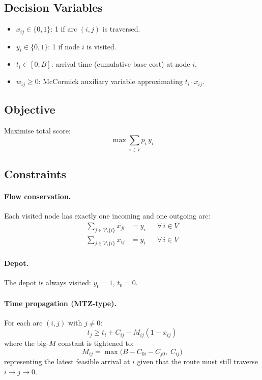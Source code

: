 \documentclass[11pt,a4paper]{article}
\begin{document}
\subsection{Decision Variables}

\begin{itemize}[nosep]
  \item $x_{ij} \in \{0,1\}$: 1 if arc $(i,j)$ is traversed.
  \item $y_i \in \{0,1\}$: 1 if node $i$ is visited.
  \item $t_i \in [0, B]$: arrival time (cumulative base cost) at node $i$.
  \item $w_{ij} \geq 0$: McCormick auxiliary variable approximating $t_i \cdot x_{ij}$.
\end{itemize}

\subsection{Objective}

Maximise total score:
\begin{equation}
  \max \sum_{i \in V} p_i \, y_i
  \label{eq:obj}
\end{equation}

\subsection{Constraints}

\paragraph{Flow conservation.}
Each visited node has exactly one incoming and one outgoing arc:
\begin{align}
  \sum_{j \in V \setminus \{i\}} x_{ji} &= y_i && \forall\, i \in V \label{eq:inflow} \\
  \sum_{j \in V \setminus \{i\}} x_{ij} &= y_i && \forall\, i \in V \label{eq:outflow}
\end{align}

\paragraph{Depot.}
The depot is always visited: $y_0 = 1$, $t_0 = 0$.

\paragraph{Time propagation (MTZ-type).}
For each arc $(i,j)$ with $j \neq 0$:
\begin{equation}
  t_j \geq t_i + C_{ij} - M_{ij}(1 - x_{ij})
  \label{eq:mtz}
\end{equation}
where the big-$M$ constant is tightened to:
\begin{equation}
  M_{ij} = \max\bigl(B - C_{0i} - C_{j0},\; C_{ij}\bigr)
  \label{eq:bigM}
\end{equation}
representing the latest feasible arrival at $i$ given that the route must still traverse $i \to j \to 0$.
\end{document}
